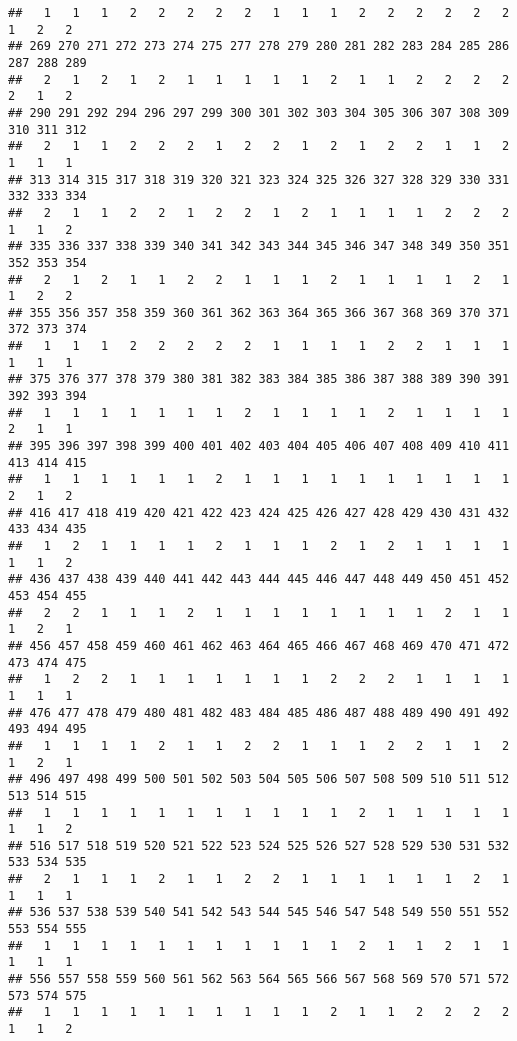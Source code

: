 \documentclass[]{article}
\begin{document}
\begin{verbatim}
##   1   1   1   2   2   2   2   2   1   1   1   2   2   2   2   2   2   1   2   2 
## 269 270 271 272 273 274 275 277 278 279 280 281 282 283 284 285 286 287 288 289 
##   2   1   2   1   2   1   1   1   1   1   2   1   1   2   2   2   2   2   1   2 
## 290 291 292 294 296 297 299 300 301 302 303 304 305 306 307 308 309 310 311 312 
##   2   1   1   2   2   2   1   2   2   1   2   1   2   2   1   1   2   1   1   1 
## 313 314 315 317 318 319 320 321 323 324 325 326 327 328 329 330 331 332 333 334 
##   2   1   1   2   2   1   2   2   1   2   1   1   1   1   2   2   2   1   1   2 
## 335 336 337 338 339 340 341 342 343 344 345 346 347 348 349 350 351 352 353 354 
##   2   1   2   1   1   2   2   1   1   1   2   1   1   1   1   2   1   1   2   2 
## 355 356 357 358 359 360 361 362 363 364 365 366 367 368 369 370 371 372 373 374 
##   1   1   1   2   2   2   2   2   1   1   1   1   2   2   1   1   1   1   1   1 
## 375 376 377 378 379 380 381 382 383 384 385 386 387 388 389 390 391 392 393 394 
##   1   1   1   1   1   1   1   2   1   1   1   1   2   1   1   1   1   2   1   1 
## 395 396 397 398 399 400 401 402 403 404 405 406 407 408 409 410 411 413 414 415 
##   1   1   1   1   1   1   2   1   1   1   1   1   1   1   1   1   1   2   1   2 
## 416 417 418 419 420 421 422 423 424 425 426 427 428 429 430 431 432 433 434 435 
##   1   2   1   1   1   1   2   1   1   1   2   1   2   1   1   1   1   1   1   2 
## 436 437 438 439 440 441 442 443 444 445 446 447 448 449 450 451 452 453 454 455 
##   2   2   1   1   1   2   1   1   1   1   1   1   1   1   2   1   1   1   2   1 
## 456 457 458 459 460 461 462 463 464 465 466 467 468 469 470 471 472 473 474 475 
##   1   2   2   1   1   1   1   1   1   1   2   2   2   1   1   1   1   1   1   1 
## 476 477 478 479 480 481 482 483 484 485 486 487 488 489 490 491 492 493 494 495 
##   1   1   1   1   2   1   1   2   2   1   1   1   2   2   1   1   2   1   2   1 
## 496 497 498 499 500 501 502 503 504 505 506 507 508 509 510 511 512 513 514 515 
##   1   1   1   1   1   1   1   1   1   1   1   2   1   1   1   1   1   1   1   2 
## 516 517 518 519 520 521 522 523 524 525 526 527 528 529 530 531 532 533 534 535 
##   2   1   1   1   2   1   1   2   2   1   1   1   1   1   1   2   1   1   1   1 
## 536 537 538 539 540 541 542 543 544 545 546 547 548 549 550 551 552 553 554 555 
##   1   1   1   1   1   1   1   1   1   1   1   2   1   1   2   1   1   1   1   1 
## 556 557 558 559 560 561 562 563 564 565 566 567 568 569 570 571 572 573 574 575 
##   1   1   1   1   1   1   1   1   1   1   2   1   1   2   2   2   2   1   1   2 

\end{verbatim}
\end{document}
